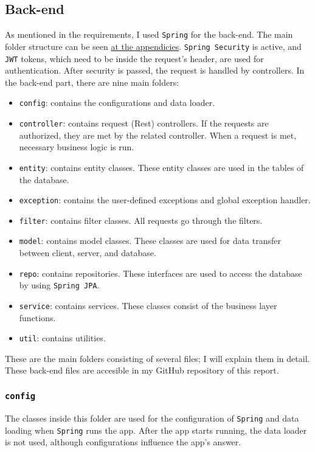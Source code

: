 \subsection{Back-end}

As mentioned in the requirements, I used \texttt{Spring} for the back-end. The main folder structure can be seen \hyperref[back-end-tree]{at the appendicies}. \texttt{Spring Security} is active, and \texttt{JWT} tokens, which need to be inside the request's header, are used for authentication. After security is passed, the request is handled by controllers. In the back-end part, there are nine main folders:
\begin{itemize}
  \item \texttt{config}: contains the configurations and data loader.
  \item \texttt{controller}: contains request (Rest) controllers. If the requests are authorized, they are met by the related controller. When a request is met, necessary business logic is run.
  \item \texttt{entity}: contains entity classes. These entity classes are used in the tables of the database.
  \item \texttt{exception}: contains the user-defined exceptions and global exception handler.
  \item \texttt{filter}: contains filter classes. All requests go through the filters.
  \item \texttt{model}: contains model classes. These classes are used for data transfer between client, server, and database.
  \item \texttt{repo}: contains repositories. These interfaces are used to access the database by using \texttt{Spring JPA}.
  \item \texttt{service}: contains services. These classes consist of the business layer functions.
  \item \texttt{util}: contains utilities.
\end{itemize}
These are the main folders consisting of several files; I will explain them in detail. These back-end files are accesible in my GitHub repository of this report.
\newpage


\subsubsection{\texttt{config}}

The classes inside this folder are used for the configuration of \texttt{Spring} and data loading when \texttt{Spring} runs the app. After the app starts running, the data loader is not used, although configurations influence the app's answer.

